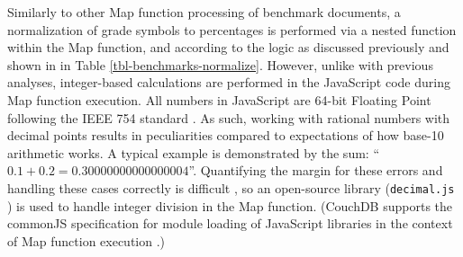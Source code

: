Similarly to other Map function processing of benchmark documents, a normalization of grade symbols to percentages is performed via a nested function within the Map function, and according to the logic as discussed previously and shown in in Table \ref{tbl-benchmarks-normalize}. However, unlike with previous analyses, integer-based calculations are performed in the JavaScript code during Map function execution. All numbers in JavaScript are 64-bit Floating Point following the IEEE 754 standard \cite{floatingPoint}. As such, working with rational numbers with decimal points results in peculiarities compared to expectations of how base-10 arithmetic works. A typical example is demonstrated by the sum: ``$0.1 + 0.2 = 0.30000000000000004$''. Quantifying the margin for these errors and handling these cases correctly is difficult \cite{Goldberg1991}, so an open-source library (\texttt{decimal.js} \cite{decimaljs}) is used to handle integer division in the Map function. (CouchDB supports the commonJS specification for module loading of JavaScript libraries in the context of Map function execution \cite{commonJsMapFn}.)


